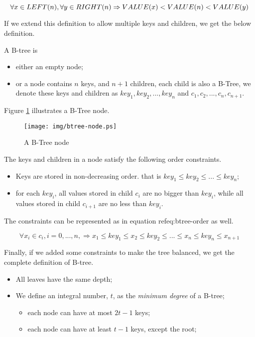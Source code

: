 \documentclass{article}
\begin{document}
\begin{equation}
\forall x \in LEFT(n), \forall y \in RIGHT(n) \\
\Rightarrow VALUE(x)<VALUE(n)<VALUE(y)
\end{equation}

If we extend this definition to allow multiple keys and children, we get the 
below definition.

A B-tree is 
\begin{itemize}
\item either an empty node;
\item or a node contains $n$ keys, and $n+1$ children, each child is
also a B-Tree, we denote these keys and children as $key_1, key_2,
..., key_n$ and $c_1, c_2, ..., c_n, c_{n+1}$.
\end{itemize}

Figure \ref{fig:btree-node} illustrates a B-Tree node.

\begin{figure}[htbp]
       \begin{center}
	\texttt{[image: img/btree-node.ps]}
        \caption{A B-Tree node} \label{fig:btree-node}
       \end{center}
\end{figure}

The keys and children in a node satisfy the following order constraints.

\begin{itemize}
\item Keys are stored in non-decreasing order. that is $key_1 \leq
key_2 \leq ... \leq key_n$;
\item for each $key_i$, all values stored in child $c_i$ are no bigger 
than $key_i$, while all values stored in child $c_{i+1}$ are no less
than $key_i$.
\end{itemize}

The constraints can be represented as in equation ref{eq:btree-order}
as well.

\begin{equation}
\forall x_i \in c_i, i=0, ..., n, \Rightarrow x_1 \leq key_1 \leq
x_2 \leq key_2 \leq ... \leq x_n \leq key_n \leq x_{n+1}
\end{equation}

Finally, if we added some constraints to make the tree balanced, we get the
complete definition of B-tree.

\begin{itemize}
\item All leaves have the same depth;
\item We define an integral number, $t$, as the {\em minimum degree} of a 
B-tree;
    \begin{itemize}
        \item each node can have at most $2t-1$ keys;
        \item each node can have at least $t-1$ keys, except the root;
    \end{itemize}
\end{itemize}
\end{document}

